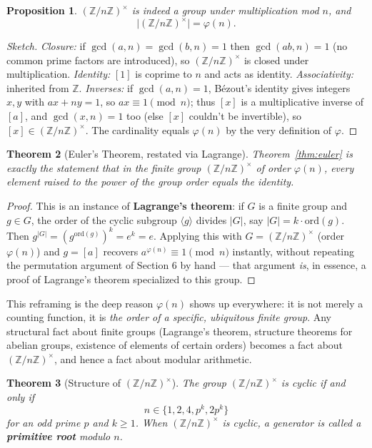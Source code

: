 \documentclass[11pt]{article}
\newtheorem{theorem}{Theorem}[section]
\newtheorem{proposition}[theorem]{Proposition}
\theoremstyle{definition}
\theoremstyle{remark}
\newcommand{\Z}{\mathbb{Z}}
\begin{document}
\begin{proposition}
$(\Z/n\Z)^\times$ is indeed a group under multiplication mod $n$, and
\[
\big|(\Z/n\Z)^\times\big| = \varphi(n).
\]
\end{proposition}

\begin{proof}[Sketch]
\emph{Closure:} if $\gcd(a,n)=\gcd(b,n)=1$ then $\gcd(ab,n)=1$ (no common prime factors are introduced), so $(\Z/n\Z)^\times$ is closed under multiplication. \emph{Identity:} $[1]$ is coprime to $n$ and acts as identity. \emph{Associativity:} inherited from $\Z$. \emph{Inverses:} if $\gcd(a,n)=1$, Bézout's identity gives integers $x,y$ with $ax + ny = 1$, so $ax \equiv 1 \pmod n$; thus $[x]$ is a multiplicative inverse of $[a]$, and $\gcd(x,n)=1$ too (else $[x]$ couldn't be invertible), so $[x] \in (\Z/n\Z)^\times$. The cardinality equals $\varphi(n)$ by the very definition of $\varphi$.
\end{proof}

\begin{theorem}[Euler's Theorem, restated via Lagrange]
Theorem~\ref{thm:euler} is exactly the statement that in the finite group $(\Z/n\Z)^\times$ of order $\varphi(n)$, every element raised to the power of the group order equals the identity.
\end{theorem}

\begin{proof}
This is an instance of \textbf{Lagrange's theorem}: if $G$ is a finite group and $g \in G$, the order of the cyclic subgroup $\langle g \rangle$ divides $|G|$, say $|G| = k \cdot \mathrm{ord}(g)$. Then $g^{|G|} = (g^{\mathrm{ord}(g)})^k = e^k = e$. Applying this with $G = (\Z/n\Z)^\times$ (order $\varphi(n)$) and $g = [a]$ recovers $a^{\varphi(n)} \equiv 1 \pmod n$ instantly, without repeating the permutation argument of Section 6 by hand — that argument \emph{is}, in essence, a proof of Lagrange's theorem specialized to this group.
\end{proof}

\noindent This reframing is the deep reason $\varphi(n)$ shows up everywhere: it is not merely a counting function, it is \emph{the order of a specific, ubiquitous finite group}. Any structural fact about finite groups (Lagrange's theorem, structure theorems for abelian groups, existence of elements of certain orders) becomes a fact about $(\Z/n\Z)^\times$, and hence a fact about modular arithmetic.

\begin{theorem}[Structure of $(\Z/n\Z)^\times$]
The group $(\Z/n\Z)^\times$ is cyclic if and only if
\[
n \in \{1, 2, 4, p^k, 2p^k\}
\]
for an odd prime $p$ and $k \ge 1$. When $(\Z/n\Z)^\times$ is cyclic, a generator is called a \textbf{primitive root} modulo $n$.
\end{theorem}
\end{document}
